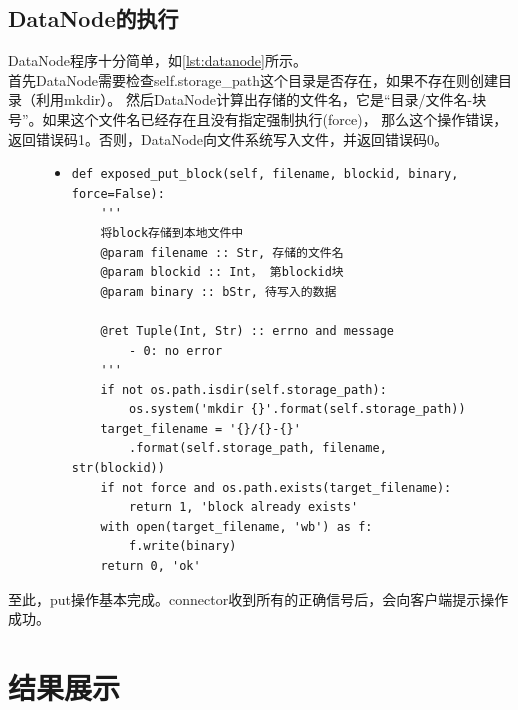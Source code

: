 \documentclass[a4paper]{article}
\begin{document}
\subsection{DataNode的执行}
DataNode程序十分简单，如\autoref{lst:datanode}所示。\\

首先DataNode需要检查self.storage\_path这个目录是否存在，如果不存在则创建目录（利用mkdir）。
然后DataNode计算出存储的文件名，它是``目录/文件名-块号''。如果这个文件名已经存在且没有指定强制执行(force)，
那么这个操作错误，返回错误码1。否则，DataNode向文件系统写入文件，并返回错误码0。
\begin{figure}[!hbt]
\begin{itemize}
\item[] \begin{lstlisting}[style=mypython, label=lst:datanode, caption=DataNode的put\_block的实现]
def exposed_put_block(self, filename, blockid, binary, force=False):
    '''
    将block存储到本地文件中
    @param filename :: Str, 存储的文件名
    @param blockid :: Int， 第blockid块
    @param binary :: bStr, 待写入的数据

    @ret Tuple(Int, Str) :: errno and message
        - 0: no error
    '''
    if not os.path.isdir(self.storage_path):
        os.system('mkdir {}'.format(self.storage_path))
    target_filename = '{}/{}-{}'
        .format(self.storage_path, filename, str(blockid))
    if not force and os.path.exists(target_filename):
        return 1, 'block already exists'
    with open(target_filename, 'wb') as f:
        f.write(binary)
    return 0, 'ok'
\end{lstlisting}
\end{itemize}
\end{figure}
至此，put操作基本完成。connector收到所有的正确信号后，会向客户端提示操作成功。
\section{结果展示}
\end{document}
